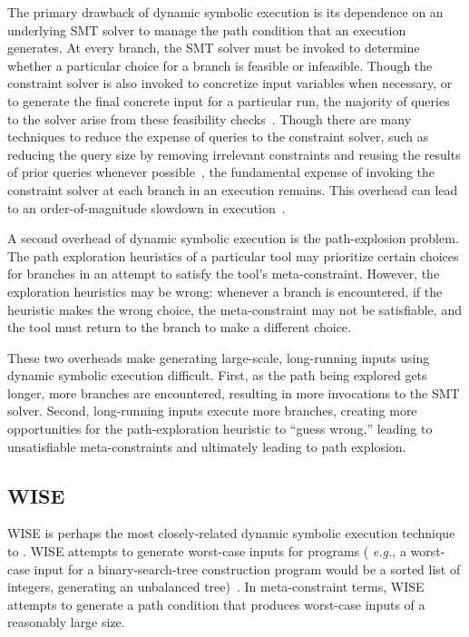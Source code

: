 The primary drawback of dynamic symbolic execution is its dependence on an
underlying SMT solver to manage the path condition that an execution generates.
At every branch, the SMT solver must be invoked to determine whether a
particular choice for a branch is feasible or infeasible. Though the
constraint solver is also invoked to concretize input variables when
necessary, or to generate the final concrete input for a particular run, the
majority of queries to the solver arise from these feasibility
checks~\cite{sen-cacm}. Though there are many techniques to reduce the expense
of queries to the constraint solver, such as reducing the query size by
removing irrelevant constraints and reusing the results of prior queries
whenever possible~\cite{klee}, the fundamental expense of invoking the
constraint solver at each branch in an execution remains. This overhead can
lead to an order-of-magnitude slowdown in execution~\cite{klee}.

A second overhead of dynamic symbolic execution is the path-explosion problem.
The path exploration heuristics of a particular tool may prioritize certain
choices for branches in an attempt to satisfy the tool's meta-constraint.
However, the exploration heuristics may be wrong: whenever a branch is
encountered, if the heuristic makes the wrong choice, the meta-constraint may
not be satisfiable, and the tool must return to the branch to make a different
choice.

These two overheads make generating large-scale, long-running inputs using
dynamic symbolic execution difficult. First, as the path being explored gets
longer, more branches are encountered, resulting in more invocations to the
SMT solver. Second, long-running inputs execute more branches, creating more
opportunities for the path-exploration heuristic to ``guess wrong,'' leading
to unsatisfiable meta-constraints and ultimately leading to path explosion.

\subsection{WISE}

WISE is perhaps the most closely-related dynamic symbolic execution technique
to \lancet. WISE attempts to generate worst-case inputs for programs ({\em
e.g.}, a worst-case input for a binary-search-tree construction program would
be a sorted list of integers, generating an unbalanced tree)~\cite{burnim-icse09}. In
meta-constraint terms, WISE attempts to generate a path condition
that produces worst-case inputs of a reasonably large size.


